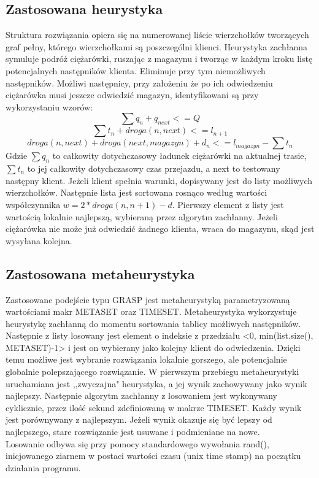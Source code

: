 \documentclass[a4paper]{article}
\begin{document}
\subsection{Zastosowana heurystyka}
Struktura rozwiązania opiera się na numerowanej liście wierzchołków tworzących graf pełny, którego wierzchołkami są poszczególni klienci. Heurystyka zachłanna symuluje podróż ciężarówki, ruszając z magazynu i tworząc w każdym kroku listę potencjalnych następników klienta. Eliminuje przy tym niemożliwych następników. Możliwi następnicy, przy założeniu że po ich odwiedzeniu ciężarówka musi jeszcze odwiedzić magazyn, identyfikowani są przy wykorzystaniu wzorów:
$$\sum q_n + q_{next} <= Q$$
$$\sum t_n + droga(n, next) <= l_{n+1}$$
$$droga(n, next) + droga(next, magazyn) + d_n <= l_{magazyn} - \sum t_n$$
Gdzie $\sum q_n$ to całkowity dotychczasowy ładunek ciężarówki na aktualnej trasie, $\sum t_n$ to jej całkowity dotychczasowy czas przejazdu, a next to testowany następny klient. Jeżeli klient spełnia warunki, dopisywany jest do listy możliwych wierzchołków. Następnie lista jest sortowana rosnąco według wartości współczynnika $w = 2*droga(n, n+1) - d$. Pierwszy element z listy jest wartością lokalnie najlepszą, wybieraną przez algorytm zachłanny. Jeżeli ciężarówka nie może już odwiedzić żadnego klienta, wraca do magazynu, skąd jest wysyłana kolejna.

\subsection{Zastosowana metaheurystyka}
Zastosowane podejście typu GRASP jest metaheurystyką parametryzowaną wartościami makr METASET oraz TIMESET. Metaheurystyka wykorzystuje heurystykę zachłanną do momentu sortowania tablicy możliwych następników. Następnie z listy losowany jest element o indeksie z przedziału <0, min(list.size(), METASET)-1> i jest on wybierany jako kolejny klient do odwiedzenia. Dzięki temu możliwe jest wybranie rozwiązania lokalnie gorszego, ale potencjalnie globalnie polepszającego rozwiązanie. W pierwszym przebiegu metaheurystyki uruchamiana jest ,,zwyczajna" heurystyka, a jej wynik zachowywany jako wynik najlepszy. Następnie algorytm zachłanny z losowaniem jest wykonywany cyklicznie, przez ilość sekund zdefiniowaną w makrze TIMESET. Każdy wynik jest porównywany z najlepszym. Jeżeli wynik okazuje się być lepszy od najlepszego, stare rozwiązanie jest usuwane i podmieniane na nowe.\\
Losowanie odbywa się przy pomocy standardowego wywołania rand(), inicjowanego ziarnem w postaci wartości czasu (unix time stamp) na początku działania programu.
\end{document}
